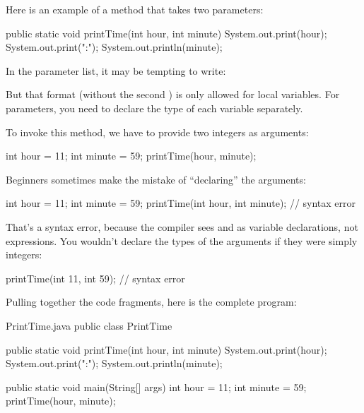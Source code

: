 

Here is an example of a method that takes two parameters:

\begin{code}
public static void printTime(int hour, int minute) {
    System.out.print(hour);
    System.out.print(":");
    System.out.println(minute);
}
\end{code}

In the parameter list, it may be tempting to write:

\begin{code}
public static void printTime(int hour, minute) {  // error
\end{code}

But that format (without the second ) is only allowed for local variables.
For parameters, you need to declare the type of each variable separately.

To invoke this method, we have to provide two integers as arguments:

\begin{code}
int hour = 11;
int minute = 59;
printTime(hour, minute);
\end{code}

Beginners sometimes make the mistake of ``declaring'' the arguments:

\begin{code}
int hour = 11;
int minute = 59;
printTime(int hour, int minute);  // syntax error
\end{code}

That's a syntax error, because the compiler sees  and  as variable declarations, not expressions.
You wouldn't declare the types of the arguments if they were simply integers:

\begin{code}
printTime(int 11, int 59);  // syntax error
\end{code}

Pulling together the code fragments, here is the complete program:


\begin{trinket}[270]{PrintTime.java}
public class PrintTime {

    public static void printTime(int hour, int minute) {
        System.out.print(hour);
        System.out.print(":");
        System.out.println(minute);
    }

    public static void main(String[] args) {
        int hour = 11;
        int minute = 59;
        printTime(hour, minute);
    }
}
\end{trinket}

